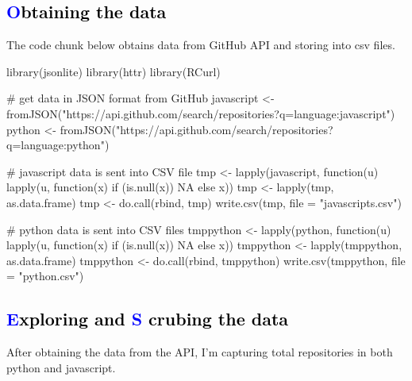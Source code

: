 \documentclass{article}\usepackage[]{graphicx}\usepackage[]{color}
\begin{document}
{\subsection*{\Large\textcolor{blue}{O\textcolor{black}{btaining the data}}}
The code chunk below obtains data from GitHub API and storing into csv files.
{}

\begin{Schunk}
\begin{Sinput}
library(jsonlite)
library(httr)
library(RCurl)

# get data in JSON format from GitHub
javascript <- fromJSON("https://api.github.com/search/repositories?q=language:javascript")
python <- fromJSON("https://api.github.com/search/repositories?q=language:python")

# javascript data is sent into CSV file
tmp <- lapply(javascript, function(u) lapply(u, function(x) if (is.null(x)) NA else x))
tmp <- lapply(tmp, as.data.frame)
tmp <- do.call(rbind, tmp)
write.csv(tmp, file = "javascripts.csv")

# python data is sent into CSV files
tmppython <- lapply(python, function(u) lapply(u, function(x) if (is.null(x)) NA else x))
tmppython <- lapply(tmppython, as.data.frame)
tmppython <- do.call(rbind, tmppython)
write.csv(tmppython, file = "python.csv")
\end{Sinput}
\end{Schunk}
\subsection*{\Large\textcolor{blue}{E\textcolor{black}{xploring and }\textcolor{blue}{ S}\textcolor{black}{ crubing the data}}}
After obtaining the data from the API, I'm capturing total repositories in both python and javascript.

}
\end{document}
